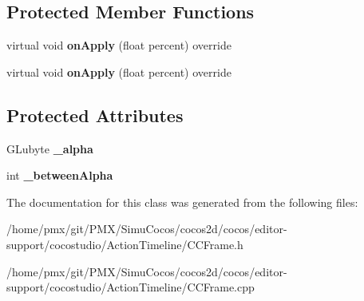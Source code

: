 \subsection*{Protected Member Functions}
\begin{DoxyCompactItemize}
\item 
\mbox{\label{classAlphaFrame_a74c3436d3c37a93f1d375a809d757924}} 
virtual void {\bfseries on\+Apply} (float percent) override
\item 
\mbox{\label{classAlphaFrame_a90fd99aa3541a73625d037b576e93af7}} 
virtual void {\bfseries on\+Apply} (float percent) override
\end{DoxyCompactItemize}
\subsection*{Protected Attributes}
\begin{DoxyCompactItemize}
\item 
\mbox{\label{classAlphaFrame_ae736c6f5cbe457f19239364bf2b526d1}} 
G\+Lubyte {\bfseries \+\_\+alpha}
\item 
\mbox{\label{classAlphaFrame_a46497a88ec2bf2caac75caa57041a550}} 
int {\bfseries \+\_\+between\+Alpha}
\end{DoxyCompactItemize}


The documentation for this class was generated from the following files\+:\begin{DoxyCompactItemize}
\item 
/home/pmx/git/\+P\+M\+X/\+Simu\+Cocos/cocos2d/cocos/editor-\/support/cocostudio/\+Action\+Timeline/C\+C\+Frame.\+h\item 
/home/pmx/git/\+P\+M\+X/\+Simu\+Cocos/cocos2d/cocos/editor-\/support/cocostudio/\+Action\+Timeline/C\+C\+Frame.\+cpp\end{DoxyCompactItemize}
